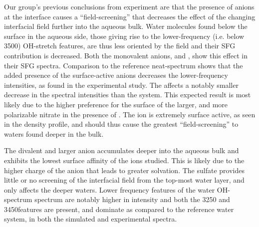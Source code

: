 Our group's previous conclusions from experiment are that the presence of anions at the interface causes a ``field-screening'' that decreases the effect of the changing interfacial field further into the aqueous bulk. Water molecules found below the surface in the aqueous side, those giving rise to the lower-frequency (i.e. below 3500\cm) OH-stretch features, are thus less oriented by the field and their SFG contribution is decreased. Both the monovalent anions, \cl and \nit, show this effect in their SFG spectra. Comparison to the reference neat-\wat spectrum shows that the added presence of the surface-active anions decreases the lower-frequency intensities, as found in the experimental study. The \cl affects a notably smaller decrease in the spectral intensities than the \nit system. This expected result is most likely due to the higher preference for the surface of the larger, and more polarizable nitrate in the presence of \ctc. The \nit ion is extremely surface active, as seen in the density profile, and should thus cause the greatest ``field-screening'' to waters found deeper in the bulk.

The divalent and larger \sul anion accumulates deeper into the aqueous bulk and exhibits the lowest surface affinity of the ions studied. This is likely due to the higher charge of the anion that leads to greater solvation. The sulfate provides little or no screening of the interfacial field from the top-most water layer, and only affects the deeper waters. Lower frequency features of the water OH-spectrum spectrum are notably higher in intensity and both the 3250 and 3450\cm features are present, and dominate as compared to the reference water system, in both the simulated and experimental spectra.

